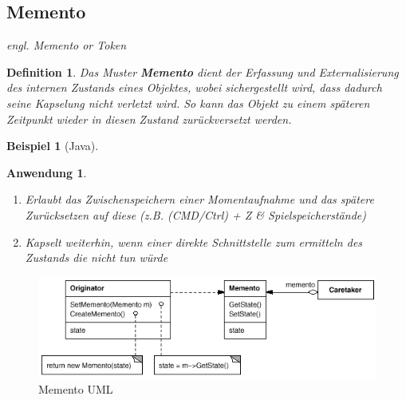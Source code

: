 \documentclass[a4paper]{article}
\theoremstyle{break}
\newtheorem{defi}{Definition}[section]
\newtheorem{ex}{Beispiel}[section]
\newtheorem{why}{Anwendung}[section]
\begin{document}
\subsection{Memento}
\textit{engl. Memento or Token}
\begin{defi}
	Das Muster \textbf{Memento} dient der Erfassung und Externalisierung des internen Zustands eines Objektes, wobei sichergestellt wird, dass dadurch seine Kapselung nicht verletzt wird. So kann das Objekt zu einem späteren Zeitpunkt wieder in diesen Zustand zurückversetzt werden.
\end{defi}
\begin{ex}[Java]
		
		\bigskip %
		
		
\end{ex}
\begin{why}
	\begin{enumerate}
		\item Erlaubt das Zwischenspeichern einer Momentaufnahme und das spätere Zurücksetzen auf diese (z.B. (CMD/Ctrl) + Z \& Spielspeicherstände)
		\item Kapselt weiterhin, wenn einer direkte Schnittstelle zum ermitteln des Zustands die nicht tun würde
	\end{enumerate}
\end{why}
\begin{figure}[H]
	\centering
	\includegraphics[width=\textwidth]{../diagrams/uml/MementoPattern.png}
	\caption{Memento UML}
\end{figure}

\newpage
\end{document}
